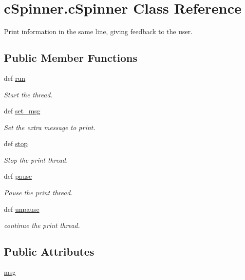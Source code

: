 \hypertarget{classcSpinner_1_1cSpinner}{\section{c\-Spinner.\-c\-Spinner \-Class \-Reference}
\label{classcSpinner_1_1cSpinner}
}


\-Print information in the same line, giving feedback to the user.  


\subsection*{\-Public \-Member \-Functions}
\begin{DoxyCompactItemize}
\item 
def \hyperlink{classcSpinner_1_1cSpinner_abc727891482c78f4a1df8b4d26675f43}{run}
\begin{DoxyCompactList}\small\item\em \-Start the thread. \end{DoxyCompactList}\item 
def \hyperlink{classcSpinner_1_1cSpinner_a96e91b915c76fa4eb1068ff10a048678}{set\-\_\-msg}
\begin{DoxyCompactList}\small\item\em \-Set the extra message to print. \end{DoxyCompactList}\item 
def \hyperlink{classcSpinner_1_1cSpinner_a15dca75e0f064e56b6259858cba89ecd}{stop}
\begin{DoxyCompactList}\small\item\em \-Stop the print thread. \end{DoxyCompactList}\item 
def \hyperlink{classcSpinner_1_1cSpinner_a1ba68a7036630cb9d5b963b7bb7f71f9}{pause}
\begin{DoxyCompactList}\small\item\em \-Pause the print thread. \end{DoxyCompactList}\item 
def \hyperlink{classcSpinner_1_1cSpinner_ae842f488ea435f06a49b19a8a8f91793}{unpause}
\begin{DoxyCompactList}\small\item\em continue the print thread. \end{DoxyCompactList}\end{DoxyCompactItemize}
\subsection*{\-Public \-Attributes}
\begin{DoxyCompactItemize}
\item 
\hyperlink{classcSpinner_1_1cSpinner_a58b879cfb514915a371d25fbf031210b}{msg}
\end{DoxyCompactItemize}
